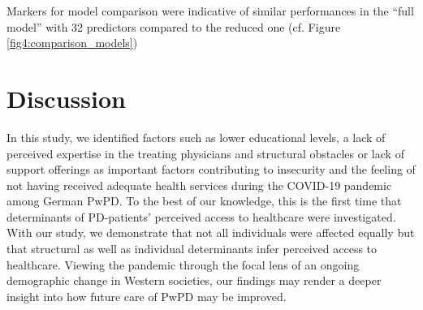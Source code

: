 \documentclass[a4paper,oneside,11pt,english]{scrartcl}
\begin{document}
\begin{table}[ht]
	\caption{Significant factors contibuting to unmet care needs during \textsc{COVID}-19 pandemic according to the reduced \textsc{GLM}:}
	\label{tab2:reduced_model}
	\centering
\end{table}	 

Markers for model comparison were indicative of similar performances in the ``full model'' with 32 predictors compared to the reduced one (cf. Figure \ref{fig4:comparison_models})


\newpage


\section*{Discussion}
In this study, we identified factors such as lower educational levels, a lack of perceived expertise in the treating physicians and structural obstacles or lack of support offerings as important factors contributing to insecurity and the feeling of not having received adequate health services during the \textsc{COVID}-19 pandemic among German Pw\textsc{PD}. To the best of our knowledge, this is the first time that determinants of \textsc{PD}-patients' perceived access to healthcare were investigated. With our study, we demonstrate that not all individuals were affected equally but that structural as well as individual determinants infer perceived access to healthcare. Viewing the pandemic through the focal lens of an ongoing demographic change in Western societies, our findings may render a deeper insight into how future care of Pw\textsc{PD} may be improved. 
\end{document}
